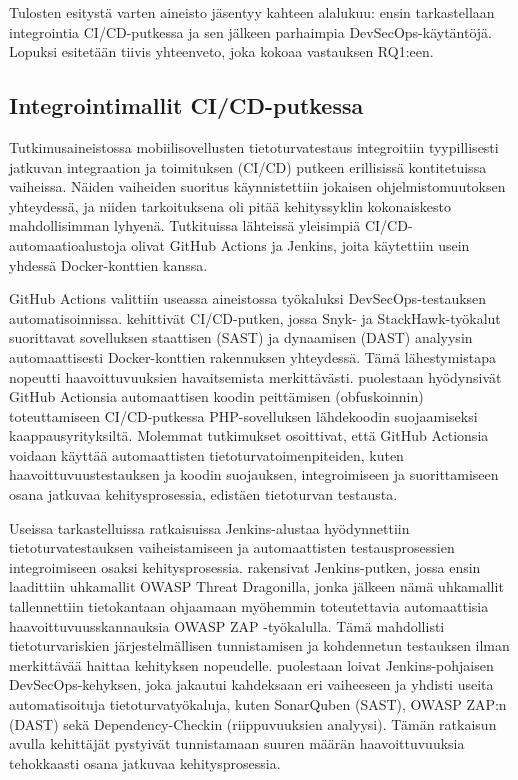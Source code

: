 \documentclass[bscthesis,finnish,oneside,biblatex]{uefcsthesis}
\begin{document}
    Tulosten esitystä varten aineisto jäsentyy kahteen alalukuu: ensin tarkastellaan integrointia CI/CD-putkessa ja sen jälkeen parhaimpia DevSecOps-käytäntöjä. Lopuksi esitetään tiivis yhteenveto, joka kokoaa vastauksen RQ1:een.

    \subsection{Integrointimallit CI/CD-putkessa}

    Tutkimusaineistossa mobiilisovellusten tietoturvatestaus integroitiin tyypillisesti jatkuvan integraation ja toimituksen (CI/CD) putkeen erillisissä kontitetuissa vaiheissa. Näiden vaiheiden suoritus käynnistettiin jokaisen ohjelmistomuutoksen yhteydessä, ja niiden tarkoituksena oli pitää kehityssyklin kokonaiskesto mahdollisimman lyhyenä. Tutkituissa lähteissä yleisimpiä CI/CD-automaatioalustoja olivat GitHub Actions ja Jenkins, joita käytettiin usein yhdessä Docker-konttien kanssa.

    GitHub Actions valittiin useassa aineistossa työkaluksi DevSecOps-testauksen automatisoinnissa. \cite{marandi2023_ias} kehittivät CI/CD-putken, jossa Snyk- ja StackHawk-työkalut suorittavat sovelluksen staattisen (SAST) ja dynaamisen (DAST) analyysin automaattisesti Docker-konttien rakennuksen yhteydessä. Tämä lähestymistapa nopeutti haavoittuvuuksien havaitsemista merkittävästi. \cite{afifah2024_coi} puolestaan hyödynsivät GitHub Actionsia automaattisen koodin peittämisen (obfuskoinnin) toteuttamiseen CI/CD-putkessa PHP-sovelluksen lähdekoodin suojaamiseksi kaappausyrityksiltä. Molemmat tutkimukset osoittivat, että GitHub Actionsia voidaan käyttää automaattisten tietoturvatoimenpiteiden, kuten haavoittuvuustestauksen ja koodin suojauksen, integroimiseen ja suorittamiseen osana jatkuvaa kehitysprosessia, edistäen tietoturvan testausta.

    Useissa tarkastelluissa ratkaisuissa Jenkins-alustaa hyödynnettiin tietoturvatestauksen vaiheistamiseen ja automaattisten testausprosessien integroimiseen osaksi kehitysprosessia. \cite{nikolov2024_fit} rakensivat Jenkins-putken, jossa ensin laadittiin uhkamallit OWASP Threat Dragonilla, jonka jälkeen nämä uhkamallit tallennettiin tietokantaan ohjaamaan myöhemmin toteutettavia automaattisia haavoittuvuusskannauksia OWASP ZAP -työkalulla. Tämä mahdollisti tietoturvariskien järjestelmällisen tunnistamisen ja kohdennetun testauksen ilman merkittävää haittaa kehityksen nopeudelle. \cite{feio2024_empirical} puolestaan loivat Jenkins-pohjaisen DevSecOps-kehyksen, joka jakautui kahdeksaan eri vaiheeseen ja yhdisti useita automatisoituja tietoturvatyökaluja, kuten SonarQuben (SAST), OWASP ZAP:n (DAST) sekä Dependency-Checkin (riippuvuuksien analyysi). Tämän ratkaisun avulla kehittäjät pystyivät tunnistamaan suuren määrän haavoittuvuuksia tehokkaasti osana jatkuvaa kehitysprosessia.
\end{document}
